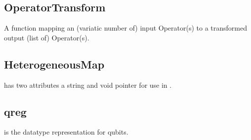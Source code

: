 \subsection{\textbf{OperatorTransform}}\label{subsec:OperatorTransform}
 A function mapping an (variatic number of) input Operator(s) to a transformed output (list of) Operator(s). 

\subsection{\textbf{HeterogeneousMap}}\label{subsec:HeterogeneousMap}
 has two attributes a string  and void pointer  for use in \Clang.

\subsection{\textbf{qreg}}\label{subsec:qreg}
 is the datatype representation for qubits.
